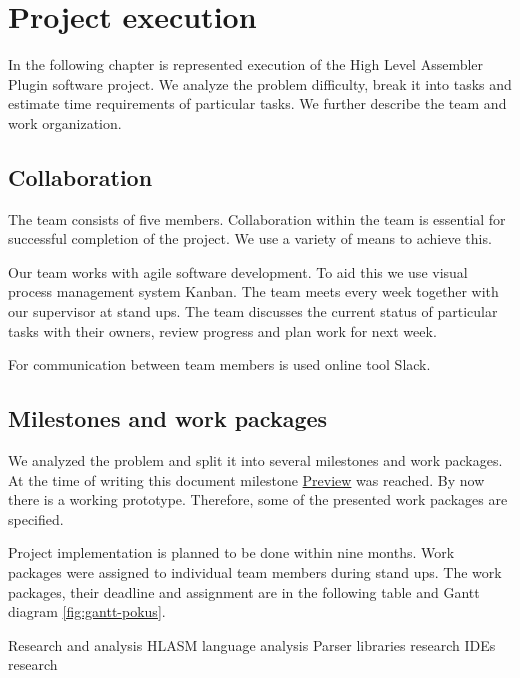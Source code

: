 \chapter{Project execution}



In the following chapter is represented execution of the High Level Assembler Plugin software project. 
We analyze the problem difficulty, break it into tasks and estimate time requirements of particular tasks.
We further describe the team and work organization.

\section{Collaboration}
The team consists of five members. Collaboration within the team is essential for successful completion of the project. We use a variety of means to achieve this. 

Our team works with agile software development. To aid this we use visual process management system Kanban. The team meets every week together with our supervisor at stand ups. The team discusses the current status of particular tasks with their owners, review progress and plan work for next week.

For communication between team members is used online tool Slack.

\section{Milestones and work packages}
We analyzed the problem and split it into several milestones and work packages. At the time of writing this document milestone \hyperref[milestone_preview]{Preview} was reached. By now there is a working prototype. Therefore, some of the presented work packages are specified. 


Project implementation is planned to be done within nine months. Work packages were assigned to individual team members during stand ups. The work packages, their deadline and assignment are in the following table and Gantt diagram \ref{fig:gantt-pokus}. 

\bms
	\itemm Research and analysis 
		\bwp
			\itemwp HLASM language analysis 
			\itemwp Parser libraries research 
			\itemwp IDEs research 
		\eenum
	
